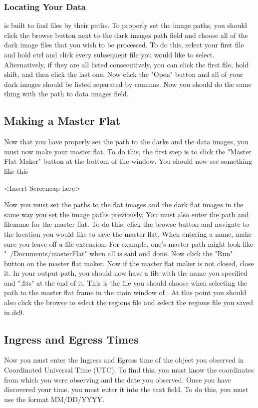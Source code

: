 \documentclass{article}
\begin{document}
\subsubsection{Locating Your Data}

	\oscaar  is built to find files by their paths. To properly set the image paths, you should click the browse button next to the dark images path field and choose all of the dark image files that you wish to be processed. To do this, select your first file and hold ctrl and click every subsequent file you would like to select. Alternatively, if they are all listed consecutively, you can click the first file, hold shift, and then click the last one. Now click the "Open" button and all of your dark images should be listed separated by commas. Now you should do the same thing with the path to data images field.
	
\subsection{Making a Master Flat}
Now that you have properly set the path to the darks and the data images, you must now make your master flat. To do this, the first step is to click the "Master Flat Maker" button at the bottom of the \oscaar window. You should now see something like this

<Insert Screencap here>

Now you must set the paths to the flat images and the dark flat images in the same way you set the image paths previously. You must also enter the path and filename for the master flat. To do this, click the browse button and navigate to the location you would like to save the master flat. When entering a name, make sure you leave off a file extension. For example, one's master path might look like "~/Documents/masterFlat" when all is said and done. Now click the "Run" button on the master flat maker. Now if the master flat maker is not closed, close it. In your output path, you should now have a file with the name you specified and ".fits" at the end of it. This is the file you should choose when selecting the path to the master flat frame in the main window of \oscaar. At this point you should also click the browse to select the regions file and select the regions file you saved in ds9.

\subsection{Ingress and Egress Times}
Now you must enter the Ingress and Egress time of the object you observed in Coordinated Universal Time (UTC). To find this, you must know the coordinates from which you were observing and the date you observed. Once you have discovered your time, you must enter it into the text field. To do this, you must use the format MM/DD/YYYY.
\end{document}
